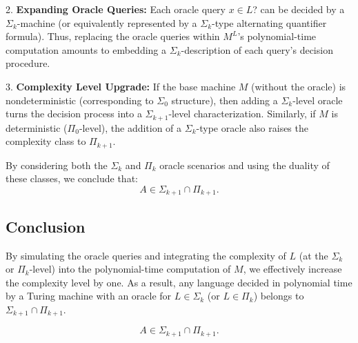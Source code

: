 \documentclass[a4paper]{article}
\begin{document}
2. \textbf{Expanding Oracle Queries:}
   Each oracle query \( x \in L \)? can be decided by a \(\Sigma_k\)-machine (or equivalently represented by a \(\Sigma_k\)-type alternating quantifier formula). Thus, replacing the oracle queries within \( M^L \)'s polynomial-time computation amounts to embedding a \(\Sigma_k\)-description of each query's decision procedure.

3. \textbf{Complexity Level Upgrade:}
   If the base machine \( M \) (without the oracle) is nondeterministic (corresponding to \(\Sigma_0\) structure), then adding a \(\Sigma_k\)-level oracle turns the decision process into a \(\Sigma_{k+1}\)-level characterization. Similarly, if \( M \) is deterministic (\(\Pi_0\)-level), the addition of a \(\Sigma_k\)-type oracle also raises the complexity class to \(\Pi_{k+1}\).

   By considering both the \(\Sigma_k\) and \(\Pi_k\) oracle scenarios and using the duality of these classes, we conclude that:
   \[
   A \in \Sigma_{k+1} \cap \Pi_{k+1}.
   \]

\subsection*{Conclusion}
By simulating the oracle queries and integrating the complexity of \( L \) (at the \(\Sigma_k\) or \(\Pi_k\)-level) into the polynomial-time computation of \( M \), we effectively increase the complexity level by one. As a result, any language decided in polynomial time by a Turing machine with an oracle for \( L \in \Sigma_k \) (or \( L \in \Pi_k \)) belongs to \(\Sigma_{k+1} \cap \Pi_{k+1}\).

\[
\boxed{A \in \Sigma_{k+1} \cap \Pi_{k+1}.}
\]
\end{document}

